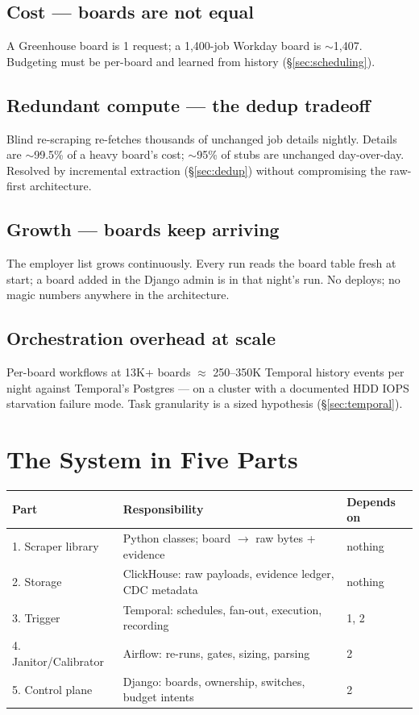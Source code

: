 \documentclass[11pt,a4paper]{article}
\begin{document}
\subsection{Cost --- boards are not equal}
A Greenhouse board is 1 request; a 1{,}400-job Workday board is $\sim$1{,}407. Budgeting must be per-board
and learned from history (\S\ref{sec:scheduling}).

\subsection{Redundant compute --- the dedup tradeoff}
Blind re-scraping re-fetches thousands of unchanged job details nightly. Details are $\sim$99.5\% of a heavy
board's cost; $\sim$95\% of stubs are unchanged day-over-day. Resolved by incremental extraction
(\S\ref{sec:dedup}) without compromising the raw-first architecture.

\subsection{Growth --- boards keep arriving}
The employer list grows continuously. Every run reads the board table fresh at start; a board added in the
Django admin is in that night's run. No deploys; no magic numbers anywhere in the architecture.

\subsection{Orchestration overhead at scale}
Per-board workflows at 13K+ boards $\approx$ 250--350K Temporal history events per night against Temporal's
Postgres --- on a cluster with a documented HDD IOPS starvation failure mode. Task granularity is a sized
hypothesis (\S\ref{sec:temporal}).

\section{The System in Five Parts}

\begin{center}
\begin{tabularx}{\textwidth}{@{}lXl@{}}
\toprule
\textbf{Part} & \textbf{Responsibility} & \textbf{Depends on} \\
\midrule
1. Scraper library & Python classes; board $\rightarrow$ raw bytes + evidence & nothing \\
2. Storage & ClickHouse: raw payloads, evidence ledger, CDC metadata & nothing \\
3. Trigger & Temporal: schedules, fan-out, execution, recording & 1, 2 \\
4. Janitor/Calibrator & Airflow: re-runs, gates, sizing, parsing & 2 \\
5. Control plane & Django: boards, ownership, switches, budget intents & 2 \\
\bottomrule
\end{tabularx}
\end{center}
\end{document}
